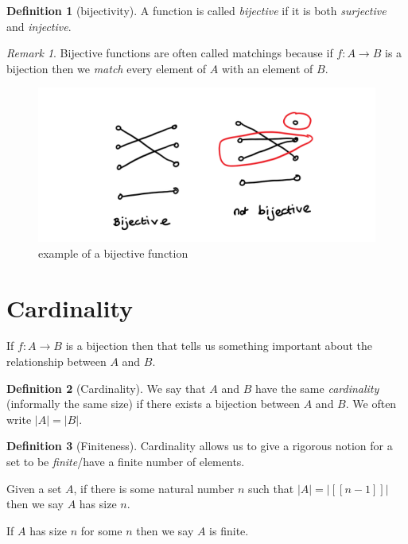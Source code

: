 \documentclass[
]{book}
\theoremstyle{definition}
\newtheorem{definition}{Definition}[chapter]
\theoremstyle{definition}
\theoremstyle{definition}
\theoremstyle{definition}
\theoremstyle{remark}
\newtheorem*{remark}{Remark}
\begin{document}
\begin{definition}[bijectivity]
A function is called \emph{bijective} if it is both \emph{surjective} and \emph{injective}.
\end{definition}

\begin{remark}
Bijective functions are often called matchings because if \(f: A \rightarrow B\) is a bijection then we \emph{match} every element of \(A\) with an element of \(B\).
\end{remark}

\begin{figure}
\centering
\includegraphics{bijective.png}
\caption{\label{fig:unnamed-chunk-4}example of a bijective function}
\end{figure}

\section{Cardinality}\label{cardinality}

If \(f: A \rightarrow B\) is a bijection then that tells us something important about the relationship between \(A\) and \(B\).

\begin{definition}[Cardinality]
We say that \(A\) and \(B\) have the same \emph{cardinality} (informally the same size) if there exists a bijection between \(A\) and \(B\). We often write \(|A| = |B|\).
\end{definition}

\begin{definition}[Finiteness]
Cardinality allows us to give a rigorous notion for a set to be \emph{finite}/have a finite number of elements.

Given a set \(A\), if there is some natural number \(n\) such that \(|A|=|[[n-1]]|\) then we say \(A\) has size \(n\).

If \(A\) has size \(n\) for some \(n\) then we say \(A\) is finite.
\end{definition}
\end{document}
